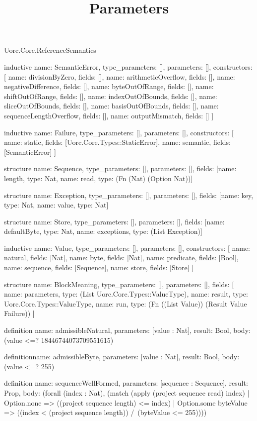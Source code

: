 \begin{lexlean}{Uorc.Core.ReferenceSemantics}
\title{Parameters}
\begin{semanticmodule}
inductive{
  name: SemanticError,
  type_parameters: [],
  parameters: [],
  constructors: [
    {name: divisionByZero, fields: []},
    {name: arithmeticOverflow, fields: []},
    {name: negativeDifference, fields: []},
    {name: byteOutOfRange, fields: []},
    {name: shiftOutOfRange, fields: []},
    {name: indexOutOfBounds, fields: []},
    {name: sliceOutOfBounds, fields: []},
    {name: basisOutOfBounds, fields: []},
    {name: sequenceLengthOverflow, fields: []},
    {name: outputMismatch, fields: []}
  ]
}

inductive{
  name: Failure,
  type_parameters: [],
  parameters: [],
  constructors: [
    {name: static, fields: [Uorc.Core.Types::StaticError]},
    {name: semantic, fields: [SemanticError]}
  ]
}

structure{
  name: Sequence,
  type_parameters: [],
  parameters: [],
  fields: [{name: length, type: Nat}, {name: read, type: (Fn (Nat) (Option Nat))}]
}

structure{
  name: Exception,
  type_parameters: [],
  parameters: [],
  fields: [{name: key, type: Nat}, {name: value, type: Nat}]
}

structure{
  name: Store,
  type_parameters: [],
  parameters: [],
  fields: [{name: defaultByte, type: Nat}, {name: exceptions, type: (List Exception)}]
}

inductive{
  name: Value,
  type_parameters: [],
  parameters: [],
  constructors: [
    {name: natural, fields: [Nat]},
    {name: byte, fields: [Nat]},
    {name: predicate, fields: [Bool]},
    {name: sequence, fields: [Sequence]},
    {name: store, fields: [Store]}
  ]
}

structure{
  name: BlockMeaning,
  type_parameters: [],
  parameters: [],
  fields: [
    {name: parameters, type: (List Uorc.Core.Types::ValueType)},
    {name: result, type: Uorc.Core.Types::ValueType},
    {name: run, type: (Fn ((List Value)) (Result Value Failure))}
  ]
}

definition{
  name: admissibleNatural,
  parameters: [value : Nat],
  result: Bool,
  body: (value <=? 18446744073709551615)
}

definition{name: admissibleByte, parameters: [value : Nat], result: Bool, body: (value <=? 255)}

definition{
  name: sequenceWellFormed,
  parameters: [sequence : Sequence],
  result: Prop,
  body: (forall (index : Nat), (match (apply (project sequence read) index)
    | Option.none => ((project sequence length) <= index)
    | Option.some byteValue => ((index < (project sequence length)) /\ (byteValue <= 255))))
}


\end{semanticmodule}
\end{lexlean}
